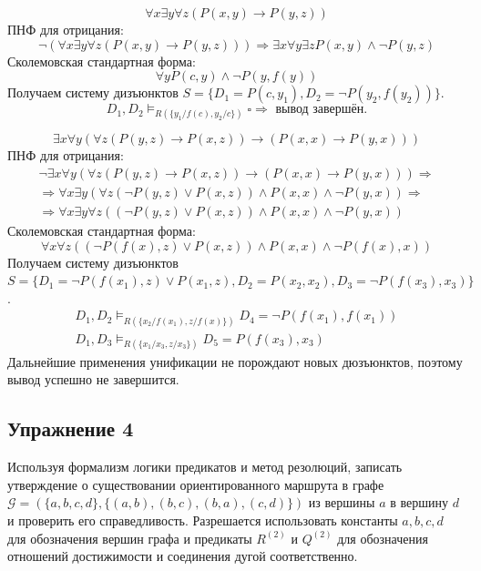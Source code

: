 \documentclass[11pt]{article}
\newcounter{th}\setcounter{th}{0}
\begin{document}
\begin{equation*}
\forall x \exists y \forall z (P(x, y) \to P(y, z))
\end{equation*}
ПНФ для отрицания:
\begin{equation*}
\lnot (\forall x \exists y \forall z (P(x, y) \to P(y, z))) \Rightarrow \exists x \forall y \exists z P(x, y) \land \lnot P(y, z)
\end{equation*}
Сколемовская стандартная форма:
\begin{equation*}
\forall y P(c, y) \land \lnot P(y, f(y))
\end{equation*}
Получаем систему дизъюнктов $S = \{D_1 = P(c, y_1), D_2 = \lnot P(y_2, f(y_2))\}$.
$$D_1, D_2 \models_{R(\{y_1/f(c), y_2/c\})} \square \Rightarrow \text{ вывод завершён.}$$

\begin{equation*}
\exists x \forall y (\forall z (P(y, z) \to P(x, z)) \to (P(x, x) \to P(y, x)))
\end{equation*}
ПНФ для отрицания:
\begin{multline*}
\lnot \exists x \forall y (\forall z (P(y, z) \to P(x, z)) \to (P(x, x) \to P(y, x)))
\Rightarrow \\
\Rightarrow
\forall x \exists y (\forall z (\lnot P(y, z) \lor P(x, z)) \land P(x, x) \land \lnot P(y, x))
\Rightarrow \\
\Rightarrow
\forall x \exists y \forall z ((\lnot P(y, z) \lor P(x, z)) \land P(x, x) \land \lnot P(y, x))
\end{multline*}
Сколемовская стандартная форма:
\begin{equation*}
\forall x \forall z ((\lnot P(f(x), z) \lor P(x, z)) \land P(x, x) \land \lnot P(f(x), x))
\end{equation*}
Получаем систему дизъюнктов $S = \{D_1 = \lnot P(f(x_1), z) \lor P(x_1, z), D_2 = P(x_2, x_2), D_3 = \lnot P(f(x_3), x_3)\}$.
\begin{gather*}
D_1, D_2 \models_{R(\{x_2/f(x_1), z/f(x)\})} D_4 = \lnot P(f(x_1), f(x_1)) \\
D_1, D_3 \models_{R(\{x_1/x_3, z/x_3\})} D_5 = P(f(x_3), x_3)
\end{gather*}
Дальнейшие применения унификации не порождают новых дюзъюнктов, поэтому вывод успешно не завершится.
\subsection{Упражнение 4}
\label{sec:orgf23485f}
Используя формализм логики предикатов и метод резолюций, записать утверждение о существовании ориентированного маршрута в графе \(\mathcal{G} = (\{a, b, c, d\}, \{(a, b), (b, c), (b, a), (c, d)\})\) из вершины \(a\) в вершину \(d\) и проверить его справедливость. Разрешается использовать константы \(a, b, c, d\) для обозначения вершин графа и предикаты \(R^{(2)}\) и \(Q^{(2)}\) для обозначения отношений достижимости и соединения дугой соответственно.
\end{document}
